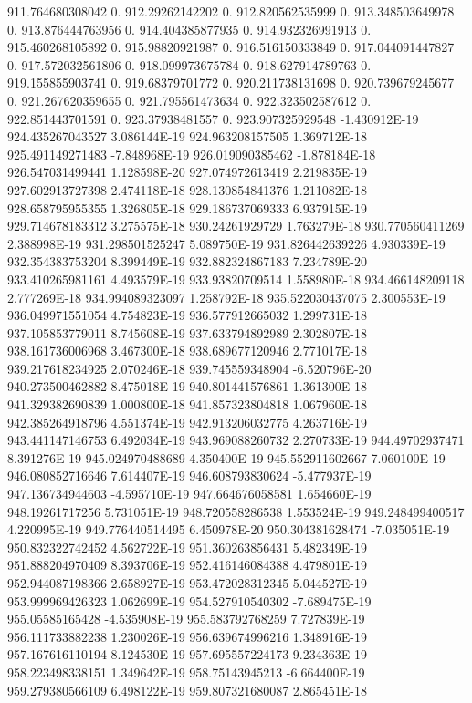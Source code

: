 911.764680308042  0.
912.29262142202  0.
912.820562535999  0.
913.348503649978  0.
913.876444763956  0.
914.404385877935  0.
914.932326991913  0.
915.460268105892  0.
915.98820921987  0.
916.516150333849  0.
917.044091447827  0.
917.572032561806  0.
918.099973675784  0.
918.627914789763  0.
919.155855903741  0.
919.68379701772  0.
920.211738131698  0.
920.739679245677  0.
921.267620359655  0.
921.795561473634  0.
922.323502587612  0.
922.851443701591  0.
923.37938481557  0.
923.907325929548  -1.430912E-19
924.435267043527  3.086144E-19
924.963208157505  1.369712E-18
925.491149271483  -7.848968E-19
926.019090385462  -1.878184E-18
926.547031499441  1.128598E-20
927.074972613419  2.219835E-19
927.602913727398  2.474118E-18
928.130854841376  1.211082E-18
928.658795955355  1.326805E-18
929.186737069333  6.937915E-19
929.714678183312  3.275575E-18
930.24261929729  1.763279E-18
930.770560411269  2.388998E-19
931.298501525247  5.089750E-19
931.826442639226  4.930339E-19
932.354383753204  8.399449E-19
932.882324867183  7.234789E-20
933.410265981161  4.493579E-19
933.93820709514  1.558980E-18
934.466148209118  2.777269E-18
934.994089323097  1.258792E-18
935.522030437075  2.300553E-19
936.049971551054  4.754823E-19
936.577912665032  1.299731E-18
937.105853779011  8.745608E-19
937.633794892989  2.302807E-18
938.161736006968  3.467300E-18
938.689677120946  2.771017E-18
939.217618234925  2.070246E-18
939.745559348904  -6.520796E-20
940.273500462882  8.475018E-19
940.801441576861  1.361300E-18
941.329382690839  1.000800E-18
941.857323804818  1.067960E-18
942.385264918796  4.551374E-19
942.913206032775  4.263716E-19
943.441147146753  6.492034E-19
943.969088260732  2.270733E-19
944.49702937471  8.391276E-19
945.024970488689  4.350400E-19
945.552911602667  7.060100E-19
946.080852716646  7.614407E-19
946.608793830624  -5.477937E-19
947.136734944603  -4.595710E-19
947.664676058581  1.654660E-19
948.19261717256  5.731051E-19
948.720558286538  1.553524E-19
949.248499400517  4.220995E-19
949.776440514495  6.450978E-20
950.304381628474  -7.035051E-19
950.832322742452  4.562722E-19
951.360263856431  5.482349E-19
951.888204970409  8.393706E-19
952.416146084388  4.479801E-19
952.944087198366  2.658927E-19
953.472028312345  5.044527E-19
953.999969426323  1.062699E-19
954.527910540302  -7.689475E-19
955.05585165428  -4.535908E-19
955.583792768259  7.727839E-19
956.111733882238  1.230026E-19
956.639674996216  1.348916E-19
957.167616110194  8.124530E-19
957.695557224173  9.234363E-19
958.223498338151  1.349642E-19
958.75143945213  -6.664400E-19
959.279380566109  6.498122E-19
959.807321680087  2.865451E-18

